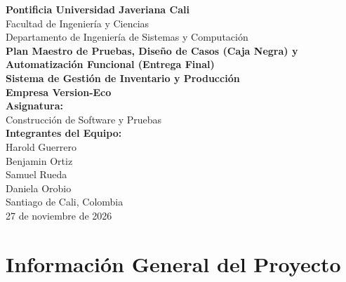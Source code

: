 \documentclass[11pt,a4paper]{article}
\begin{document}
\begin{titlepage}
    \centering
    \vspace*{0.5cm}
    
    {\Huge \textbf{Pontificia Universidad Javeriana Cali}}\\[0.3cm]
    {\LARGE Facultad de Ingeniería y Ciencias}\\[0.2cm]
    {\Large Departamento de Ingeniería de Sistemas y Computación}\\[1.5cm]
    
    {\huge \bfseries \color{primary} Plan Maestro de Pruebas, Diseño de Casos (Caja Negra) y Automatización Funcional (Entrega Final)}\\[0.5cm]
    {\LARGE \textbf{Sistema de Gestión de Inventario y Producción}}\\[0.2cm]
    {\Large \textbf{Empresa Version-Eco}}\\[1.8cm]
    
    \textbf{Asignatura:}\\
    Construcción de Software y Pruebas\\[1.2cm]
    
    \textbf{Integrantes del Equipo:}\\
    Harold Guerrero\\
    Benjamin Ortiz\\
    Samuel Rueda\\
    Daniela Orobio\\[1.5cm]
    
    \vfill
    {\large Santiago de Cali, Colombia\\ 27 de noviembre de 2026}
\end{titlepage}

\tableofcontents
\newpage

\section{Información General del Proyecto}
\end{document}
